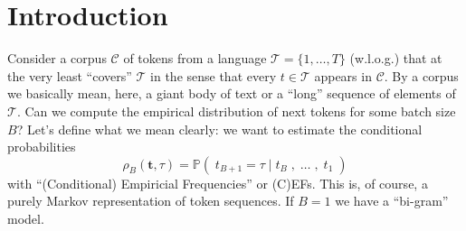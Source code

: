 \documentclass[11pt, oneside]{amsart}   	%
\title{}
\author{W. Ross Morrow}
\date{}							%
\begin{document}
\maketitle

\section{Introduction}

Consider a corpus $\mathcal{C}$ of tokens from a language $\mathcal{T} = \{1,\dotsc,T\}$ (w.l.o.g.) that at the very least ``covers'' $\mathcal{T}$ in the sense that every $t \in \mathcal{T}$ appears in $\mathcal{C}$. By a corpus we basically mean, here, a giant body of text or a ``long'' sequence of elements of $\mathcal{T}$. Can we compute the empirical distribution of next tokens for some batch size $B$? Let's define what we mean clearly: we want to estimate the conditional probabilities
\begin{equation*}
	\rho_B(\mathbf{t}, \tau) = \mathbb{P}(\; t_{B+1} = \tau \; | \; t_B \; , \; \dotsc \; , \; t_1 \; )
\end{equation*}
with ``(Conditional) Empiricial Frequencies'' or (C)EFs. This is, of course, a purely Markov representation of token sequences. If $B = 1$ we have a ``bi-gram'' model. 
\end{document}
